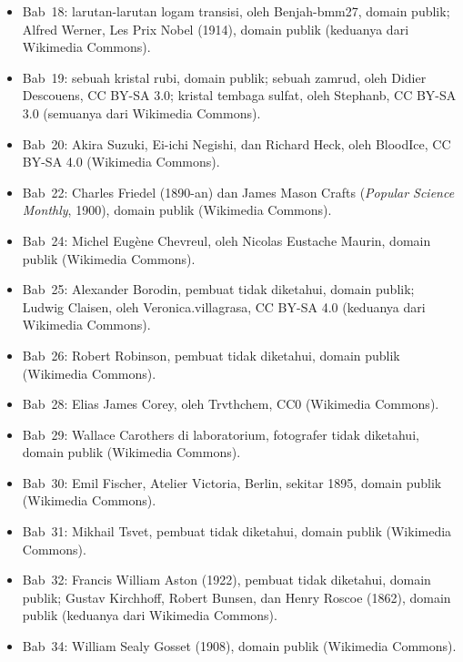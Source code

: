 \begin{itemize}
  \item Bab~18: larutan-larutan logam transisi, oleh Benjah-bmm27, domain
        publik; Alfred Werner, Les Prix Nobel (1914), domain publik
        (keduanya dari Wikimedia Commons).
  \item Bab~19: sebuah kristal rubi, domain publik; sebuah zamrud, oleh
        Didier Descouens, CC BY-SA 3.0; kristal tembaga sulfat, oleh
        Stephanb, CC BY-SA 3.0 (semuanya dari Wikimedia Commons).
  \item Bab~20: Akira Suzuki, Ei-ichi Negishi, dan Richard Heck, oleh
        BloodIce, CC BY-SA 4.0 (Wikimedia Commons).
  \item Bab~22: Charles Friedel (1890-an) dan James Mason Crafts
        (\textit{Popular Science Monthly}, 1900), domain publik (Wikimedia
        Commons).
  \item Bab~24: Michel Eug\`ene Chevreul, oleh Nicolas Eustache Maurin,
        domain publik (Wikimedia Commons).
  \item Bab~25: Alexander Borodin, pembuat tidak diketahui, domain publik;
        Ludwig Claisen, oleh Veronica.villagrasa, CC BY-SA 4.0 (keduanya
        dari Wikimedia Commons).
  \item Bab~26: Robert Robinson, pembuat tidak diketahui, domain publik
        (Wikimedia Commons).
  \item Bab~28: Elias James Corey, oleh Trvthchem, CC0 (Wikimedia Commons).
  \item Bab~29: Wallace Carothers di laboratorium, fotografer tidak
        diketahui, domain publik (Wikimedia Commons).
  \item Bab~30: Emil Fischer, Atelier Victoria, Berlin, sekitar 1895,
        domain publik (Wikimedia Commons).
  \item Bab~31: Mikhail Tsvet, pembuat tidak diketahui, domain publik
        (Wikimedia Commons).
  \item Bab~32: Francis William Aston (1922), pembuat tidak diketahui,
        domain publik; Gustav Kirchhoff, Robert Bunsen, dan Henry Roscoe
        (1862), domain publik (keduanya dari Wikimedia Commons).
  \item Bab~34: William Sealy Gosset (1908), domain publik (Wikimedia
        Commons).
\end{itemize}
\clearpage
